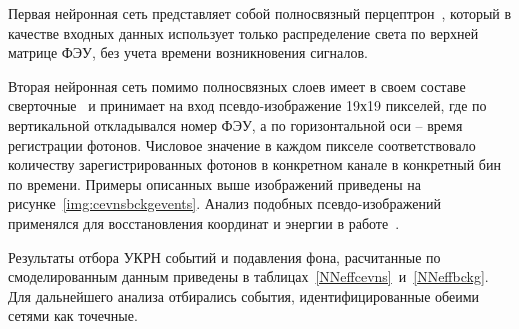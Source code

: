 Первая нейронная сеть представляет собой полносвязный перцептрон~\cite{perceptron}, который в качестве входных данных использует только распределение света по верхней матрице ФЭУ, без учета времени возникновения сигналов.

Вторая нейронная сеть помимо полносвязных слоев имеет в своем составе сверточные~\cite{INDOLIA2018679} и принимает на вход псевдо-изображение 19х19 пикселей, где по вертикальной откладывался номер ФЭУ, а по горизонтальной оси -- время регистрации фотонов. Числовое значение в каждом пикселе соответствовало количеству зарегистрированных фотонов в конкретном канале в конкретный бин по времени. Примеры описанных выше изображений приведены на рисунке~\ref{img:cevnsbckgevents}. Анализ подобных псевдо-изображений применялся для восстановления координат и энергии в работе~\cite{Delaquis_2018}. 

Результаты отбора УКРН событий и подавления фона, расчитанные по смоделированным данным приведены в таблицах~\ref{NNeffcevns}~и~\ref{NNeffbckg}. Для дальнейшего анализа отбирались события, идентифицированные обеими сетями как точечные.


